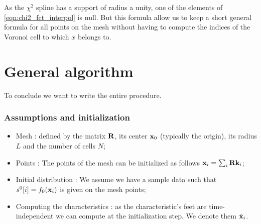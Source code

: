\documentclass[11pt,a4paper]{amsart}
\begin{document}
  As the $\chi^2$ spline has a support of radius a unity, one of the elements of \eqref{eqn:chi2_fct_interpol} is null. But this formula allow us to keep a short general formula for all points on the mesh without having to compute the indices of the Voronoi cell to which $x$ belongs to.

%
%

\section{General algorithm}

To conclude we want to write the entire procedure.

\subsubsection*{Assumptions and initialization}

\begin{itemize}
	\item Mesh : defined by the matrix $\mathbf{R}$, its center $\mathbf{x}_0$ (typically the origin), its radius $L$ and the number of cells $N$;
	\item Points : The points of the mesh can be initialized as follows $ \mathbf{x}_i = \sum_{i} \mathbf{R} \mathbf{k}_i$;
	\item Initial distribution : We assume we have a sample data such that $s^0[i] = f_0(\mathbf{x}_i)$ is given on the mesh points;
	\item Computing the characteristics : as the characteristic's feet are time-independent we can compute at the initialization step. We denote them $\tilde{\mathbf{x}}_i$.
\end{itemize}
	
\end{document}
